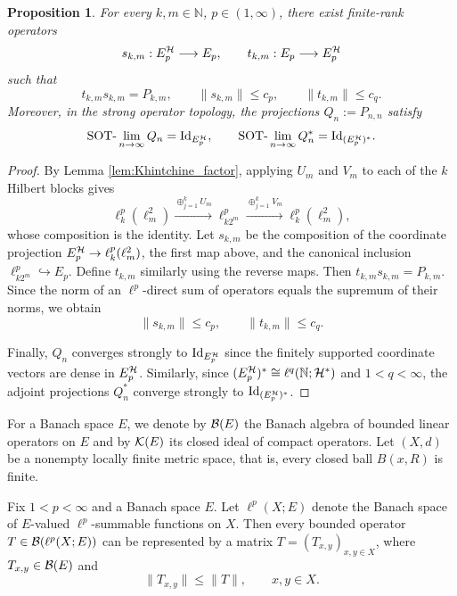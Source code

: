 \documentclass[11pt,reqno]{amsart}
\theoremstyle{definition}
\theoremstyle{plain}
\newtheorem{Pro}[Def]{Proposition}
\def\IN{\mathbb N}\def\IR{\mathbb R}\def\IE{\mathbb E}\def\IC{\mathbb C}\def\IL{\mathbb L}\def\IQ{\mathbb Q}\def\IA{\mathbb A}\def\IZ{\mathbb Z}
\begin{document}
\begin{Pro}\label{pro:block_factor}
For every $k,m\in\IN$, $p\in (1,\infty)$, there exist finite-rank operators
\[
s_{k,m}:E_p^{\mathcal H}\longrightarrow E_p,\qquad t_{k,m}:E_p\longrightarrow E_p^{\mathcal H}
\]
such that
\begin{equation}\label{eq:skm_tkm}
t_{k,m}s_{k,m}=P_{k,m},\qquad \|s_{k,m}\|\le c_p,\qquad \|t_{k,m}\|\le c_q.
\end{equation}
Moreover, in the strong operator topology, the projections $Q_n:=P_{n,n}$ satisfy
\[
\textup{SOT-}\lim_{n\to\infty} Q_n = \textup{Id}_{E_p^{\mathcal H}},\qquad \textup{SOT-}\lim_{n\to\infty} Q_n^* = \textup{Id}_{(E_p^{\mathcal H})^*}.
\]
\end{Pro}

\begin{proof}
By Lemma \ref{lem:Khintchine_factor}, applying $U_m$ and $V_m$ to each of the $k$ Hilbert blocks gives
\[
\ell^p_k(\ell^2_m)\xrightarrow{\oplus_{j=1}^k U_m}\ell^p_{k2^m}\xrightarrow{\oplus_{j=1}^k V_m}\ell^p_k(\ell^2_m),
\]
whose composition is the identity. Let $s_{k,m}$ be the composition of the coordinate projection $E_p^{\mathcal H}\to\ell^p_k(\ell^2_m)$, the first map above, and the canonical inclusion $\ell^p_{k2^m}\hookrightarrow E_p$. Define $t_{k,m}$ similarly using the reverse maps. Then $t_{k,m}s_{k,m}=P_{k,m}$. Since the norm of an $\ell^p$-direct sum of operators equals the supremum of their norms, we obtain
\[
\|s_{k,m}\|\le c_p,\qquad \|t_{k,m}\|\le c_q.
\]

Finally, $Q_n$ converges strongly to $\textup{Id}_{E_p^{\mathcal H}}$ since the finitely supported coordinate vectors are dense in $E_p^{\mathcal H}$. Similarly, since $(E_p^{\H})^*\cong\ell^q(\IN;\H^*)$ and $1<q<\infty$, the adjoint projections $Q_n^*$ converge strongly to $\textup{Id}_{(E_p^{\mathcal H})^*}$.
\end{proof}













For a Banach space $E$, we denote by $\mathcal B(E)$ the Banach algebra of bounded linear operators on $E$ and by $\mathcal K(E)$ its closed ideal of compact operators. Let $(X,d)$ be a nonempty locally finite metric space, that is, every closed ball $B(x,R)$ is finite.


Fix $1<p<\infty$ and a Banach space $E$. Let $\ell^p(X;E)$ denote the Banach space of $E$-valued $\ell^p$-summable functions on $X$. Then every bounded operator $T\in\mathcal B(\ell^p(X;E))$ can be represented by a matrix $T=(T_{x,y})_{x,y\in X}$, where $T_{x,y}\in\mathcal B(E)$ and
\begin{equation}\label{eq:entry_bound}
\|T_{x,y}\|\le\|T\|,\qquad x,y\in X.
\end{equation}
\end{document}
